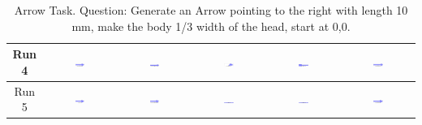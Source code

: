 \begin{table}[H]
\begin{tabular}{|c|c|c|c|c|c|}
    Run 4 & \includegraphics[width=0.15\textwidth]{./run_4/png/gpt-4o_results/Arrow.png} & \includegraphics[width=0.15\textwidth]{./run_4/png/claude-3-5-sonnet-20240620_results/Arrow.png} & \includegraphics[width=0.15\textwidth]{./run_4/png/watsonx_meta-llama_llama-3-1-70b-instruct_results/Arrow.png} & \includegraphics[width=0.15\textwidth]{./run_4/png/watsonx_meta-llama_llama-3-405b-instruct_results/Arrow.png} & \includegraphics[width=0.15\textwidth]{./run_4/png/o1-preview_results/Arrow.png} \\
    \hline
    Run 5 & \includegraphics[width=0.15\textwidth]{./run_5/png/gpt-4o_results/Arrow.png} & \includegraphics[width=0.15\textwidth]{./run_5/png/claude-3-5-sonnet-20240620_results/Arrow.png} & \includegraphics[width=0.15\textwidth]{./run_5/png/watsonx_meta-llama_llama-3-1-70b-instruct_results/Arrow.png} & \includegraphics[width=0.15\textwidth]{./run_5/png/watsonx_meta-llama_llama-3-405b-instruct_results/Arrow.png} & \includegraphics[width=0.15\textwidth]{./run_5/png/o1-preview_results/Arrow.png} \\
    \hline
    \end{tabular}
    \caption{Arrow Task. Question: Generate an Arrow pointing to the right with length 10 mm, make the body 1/3 width of the head, start at 0,0.}
\end{table}

